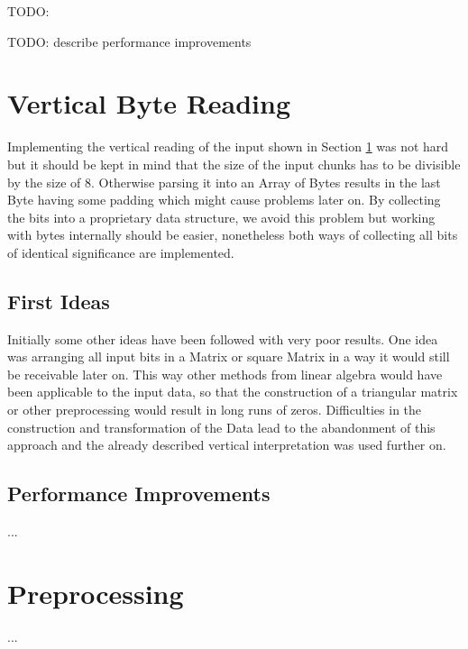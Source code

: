 \par{
TODO: %
}

\par{
TODO: describe performance improvements}

\section{Vertical Byte Reading}
\label{ch:Conceptual Design:sec:Parallel Byte Reading}

Implementing the vertical reading of the input shown in Section \ref*{ch:Conceptual Design:sec:Parallel Byte Reading} was not hard but it should be kept in mind that the size of the input chunks has to be divisible by the size of 8. Otherwise parsing it into an Array of Bytes results in the last Byte having some padding which might cause problems later on. By collecting the bits into a proprietary data structure, we avoid this problem but working with bytes internally should be easier, nonetheless both ways of collecting all bits of identical significance are implemented.

\subsection{First Ideas}
Initially some other ideas have been followed with very poor results. One idea was arranging all input bits in a Matrix or square Matrix in a way it would still be receivable later on. This way other methods from linear algebra would have been applicable to the input data, so that the construction of a triangular matrix or other preprocessing would result in long runs of zeros. Difficulties in the construction and transformation of the Data lead to the abandonment of this approach and the already described vertical interpretation was used further on.

\subsection{Performance Improvements}




...
\section{Preprocessing}
\label{ch:Conceptual Design:sec:Preprocessing}
...
